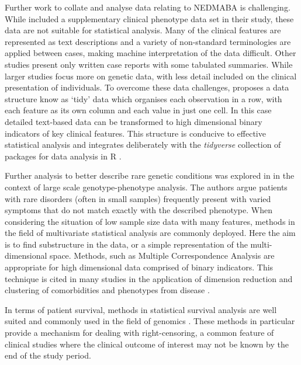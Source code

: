 \documentclass[
  authoryear,
  preprint,
  3p]{elsarticle}
\begin{document}
Further work to collate and analyse data relating to NEDMABA is
challenging. While \citet{magini2019loss} included a supplementary
clinical phenotype data set in their study, these data are not suitable
for statistical analysis. Many of the clinical features are represented
as text descriptions and a variety of non-standard terminologies are
applied between cases, making machine interpretation of the data
difficult. Other studies \citep{ji2022case, bijarnia2022growth} present
only written case reports with some tabulated summaries. While larger
studies \citep{ravenscroft2021neurogenetic, monies2019lessons} focus
more on genetic data, with less detail included on the clinical
presentation of individuals. To overcome these data challenges,
\citet{JSSv059i10} proposes a data structure know as `tidy' data which
organises each observation in a row, with each feature as its own column
and each value in just one cell. In this case detailed text-based data
can be transformed to high dimensional binary indicators of key clinical
features. This structure is conducive to effective statistical analysis
and integrates deliberately with the \emph{tidyverse} \citep{tidyverse}
collection of packages for data analysis in R \citep{rbase}.

Further analysis to better describe rare genetic conditions was explored
in \citet{diaz2020phenotype} in the context of large scale
genotype-phenotype analysis. The authors argue patients with rare
disorders (often in small samples) frequently present with varied
symptoms that do not match exactly with the described phenotype. When
considering the situation of low sample size data with many features,
methods in the field of multivariate statistical analysis are commonly
deployed. Here the aim is to find substructure in the data, or a simple
representation of the multi-dimensional space. Methods, such as Multiple
Correspondence Analysis \citep{le2010multiple} are appropriate for high
dimensional data comprised of binary indicators. This technique is cited
in many studies in the application of dimension reduction and clustering
of comorbidities and phenotypes from disease
\citep{han2018cluster, costa2013use}.

In terms of patient survival, methods in statistical survival analysis
are well suited and commonly used in the field of genomics
\citep{chen2014survival}. These methods in particular provide a
mechanism for dealing with right-censoring, a common feature of clinical
studies where the clinical outcome of interest may not be known by the
end of the study period.
\end{document}

